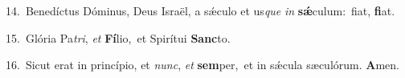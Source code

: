 {\numbfont\textcolor{\numbcolor}{14.}}~Benedíctus Dóminus, Deus Israël, a sǽculo et us\textit{que} \textit{in} \textbf{sǽ}\-culum:~\star fiat, \textbf{fi}\-at.\par
{\numbfont\textcolor{\numbcolor}{15.}}~Glória Pa\-\textit{tri}\-, \textit{et} \textbf{Fí}\-lio,~\star et Spirítui \textbf{Sanc}\-to.\par
{\numbfont\textcolor{\numbcolor}{16.}}~Sicut erat in princípio, et \textit{nunc}\-, \textit{et} \textbf{sem}\-per,~\star et in sǽcula sæculórum. \textbf{A}\-men.\par
